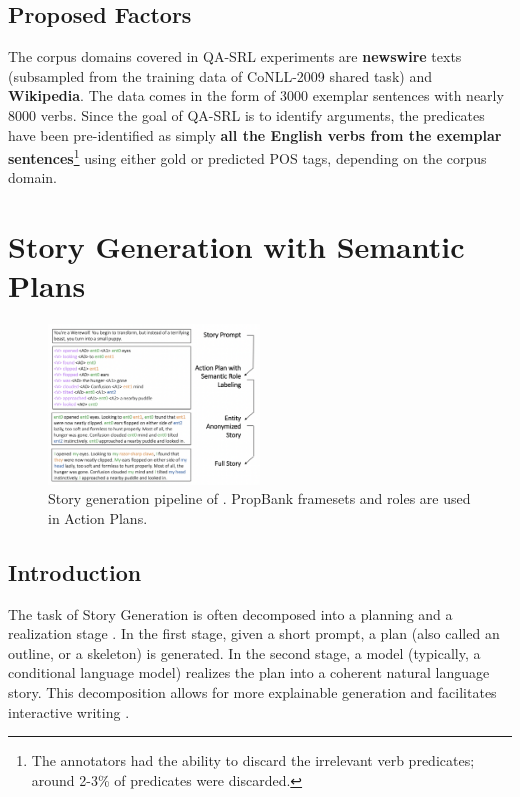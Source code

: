 \documentclass[11pt,a4paper]{article}
\begin{document}
\subsection{Proposed Factors}
The corpus domains covered in QA-SRL experiments are \textbf{newswire} texts (subsampled from the training data of CoNLL-2009 shared task) and \textbf{Wikipedia}. The data comes in the form of 3000 exemplar sentences with nearly 8000 verbs. Since the goal of QA-SRL is to identify arguments, the predicates have been pre-identified as simply \textbf{all the English verbs from the exemplar sentences}\footnote{The annotators had the ability to discard the irrelevant verb predicates; around 2-3\% of predicates were discarded.} using either gold or predicted POS tags, depending on the corpus domain. 

\section{Story Generation with Semantic Plans}
\begin{figure}[t!]
\includegraphics[width=0.5\textwidth]{fan19_storygen.png}
\caption{Story generation pipeline of . PropBank framesets and roles are used in Action Plans.}\label{fig:fan19}
\end{figure}

\subsection{Introduction}
The task of Story Generation is often decomposed into a planning and a realization stage \cite{yao2019plan,fan2019strategies,rashkin2020plotmachines}. In the first stage, given a short prompt, a plan (also called an outline, or a skeleton) is generated. In the second stage, a model (typically, a conditional language model) realizes the plan into a coherent natural language story. This decomposition allows for more explainable generation and facilitates interactive writing \cite{goldfarb2019plan}.
\end{document}
